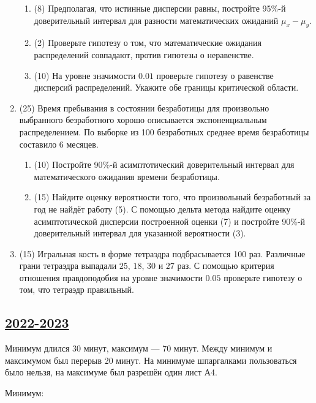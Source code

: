 \begin{enumerate}
\begin{enumerate}
\item (8) Предполагая, что истинные дисперсии равны, 
постройте 95\%-й доверительный интервал для разности математических ожиданий $\mu_x - \mu_y$.
	\item  (2) Проверьте гипотезу о том, что математические ожидания распределений совпадают, против гипотезы о неравенстве.
	\item (10) На уровне значимости $0.01$ проверьте гипотезу о равенстве дисперсий распределений.
	Укажите обе границы критической области.
\end{enumerate}

\item (25) Время пребывания в состоянии безработицы для произвольно выбранного безработного хорошо описывается экспоненциальным распределением.
По выборке из 100 безработных среднее время безработицы составило 6 месяцев.
\begin{enumerate}
\item (10) Постройте 90\%-й асимптотический доверительный интервал для математического
ожидания времени безработицы.
\item (15) Найдите оценку вероятности того, что произвольный безработный за год не найдёт работу (5).
С помощью дельта метода найдите оценку асимптотической дисперсии построенной оценки (7) и постройте 90\%-й доверительный интервал для указанной вероятности (3).
\end{enumerate}


\item (15) Игральная кость в форме тетраэдра подбрасывается 100 раз. 
Различные грани тетраэдра выпадали $25$, $18$, $30$ и $27$ раз. 
С помощью критерия отношения правдоподобия на уровне значимости $0.05$ проверьте гипотезу о том, 
что тетраэдр правильный.

\end{enumerate}

\subsection[2022-2023]{\hyperref[sec:sol_kr_04_2022_2023]{2022-2023}}
\label{sec:kr_04_2022_2023}

Минимум длился 30 минут, максимум — 70 минут. Между минимум и максимумом был перерыв 20 минут. 
На минимуме шпаргалками пользоваться было нельзя, на максимуме был разрешён один лист А4.

Минимум: 

